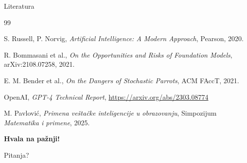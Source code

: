 \documentclass{beamer}
\begin{document}
\begin{frame}{Literatura}
\footnotesize
\begin{thebibliography}{99}

S. Russell, P. Norvig, \textit{Artificial Intelligence: A Modern Approach}, Pearson, 2020.

R. Bommasani et al., \textit{On the Opportunities and Risks of Foundation Models}, arXiv:2108.07258, 2021.

E. M. Bender et al., \textit{On the Dangers of Stochastic Parrots}, ACM FAccT, 2021.

OpenAI, \textit{GPT-4 Technical Report}, \url{https://arxiv.org/abs/2303.08774}

M. Pavlović, \textit{Primena veštačke inteligencije u obrazovanju}, Simpozijum \textit{Matematika i primene}, 2025.

\end{thebibliography}
\end{frame}

\begin{frame}{}
\centering
\vspace{1.5cm}

{\Large \textbf{Hvala na pažnji!}}

\vspace{1cm}

{\large Pitanja?}

\end{frame}
\end{document}
